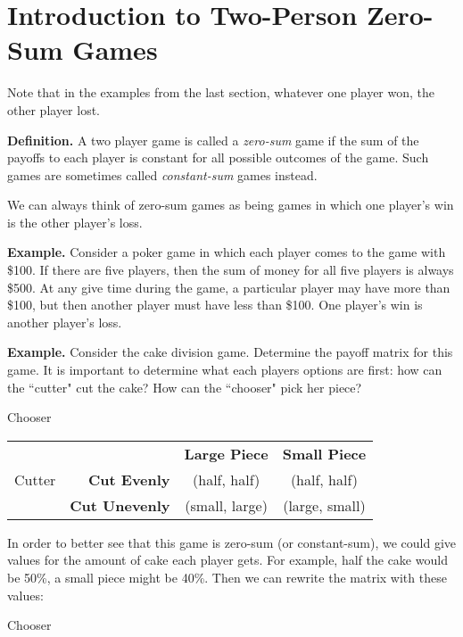 
\section{Introduction to Two-Person Zero-Sum Games}


\vspace{.2in}


Note that in the examples from the last section, whatever one player won, the other player lost. 

{\bf Definition.} A two player game is called a {\it zero-sum} game if the sum of the payoffs to each player is constant for all possible outcomes of the game. Such games are sometimes called {\it constant-sum} games instead.

We can always think of zero-sum games as being games in which one player's win is the other player's loss.

{\bf Example.} Consider a poker game in which each player comes to the game with \$100. If there are five players, then the sum of money for all five players is always \$500. At any give time during the game, a particular player may have more than \$100, but then another player must have less than \$100. One player's win is another player's loss.

{\bf Example.} Consider the cake division game. Determine the payoff matrix for this game. It is important to determine what each players options are first: how can the ``cutter" cut the cake? How can the ``chooser"  pick her piece?

\hspace{1.2in}Chooser

\begin{tabular}{l|r|c|c|}\cline{2-4}
&&\textbf{Large Piece}&\textbf{Small Piece}\\ \cline{2-4}
Cutter&\textbf{Cut Evenly} &(half, half)&(half, half)\\ \cline{2-4}
&\textbf{Cut Unevenly} &(small, large)&(large, small)\\ \cline{2-4}

\end{tabular}
\medskip

In order to better see that this game is zero-sum (or constant-sum), we could give values for the amount of cake each player gets. For example, half the cake would be 50\%, a small piece might be 40\%. Then we can rewrite the matrix with these values:

\hspace{1.2in}Chooser

